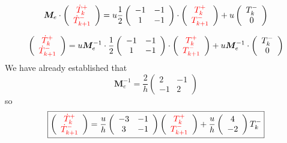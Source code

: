\begin{eqnarray}
{\bm M}_e \cdot
\left(
\begin{array}{cc}
{\color{red}\dot T_k^+}  \\
{\color{red} \dot T_{k+1}^-} 
\end{array}
\right) 
=
u\frac{1}{2}  
\left(\begin{array}{cc}
-1 & -1 \\
1 & -1 
\end{array}\right)
 \cdot 
\left( \begin{array}{cc}
{\color{red}T_k^+}  \\
{\color{red}T_{k+1}^-} 
\end{array} \right) 
+u \left( \begin{array}{cc}
{T_{k}^-}   \\  0 
\end{array} \right)
\end{eqnarray}

\begin{eqnarray}
\left(
\begin{array}{cc}
{\color{red}\dot T_k^+}  \\
{\color{red} \dot T_{k+1}^-} 
\end{array}
\right) 
=
u
{\bm M}_e^{-1} \cdot\frac{1}{2}  
\left(\begin{array}{cc}
-1 & -1 \\
1 & -1 
\end{array}\right)
 \cdot 
\left( \begin{array}{cc}
{\color{red}T_k^+}  \\
{\color{red}T_{k+1}^-} 
\end{array} \right) 
+u 
{\bm M}_e^{-1} \cdot
\left( \begin{array}{cc}
{T_{k}^-}   \\  0 
\end{array} \right)
\end{eqnarray}
We have already established that 
\[
{\bm M}_e^{-1} = 
\frac{2}{h}
\left( 
\begin{array}{cc}
2 & -1 \\
-1 & 2
\end{array}
\right)
\]
so 
\begin{eqnarray}
\boxed{
\left(
\begin{array}{cc}
{\color{red}\dot T_k^+}  \\
{\color{red} \dot T_{k+1}^-} 
\end{array}
\right)=
\frac{u}{h} 
\left(\begin{array}{cc}
    -3 & -1 \\
     3 & -1
\end{array}
\right)
\left(
\begin{array}{cc}
{\color{red}T_k^+}  \\
{\color{red}T_{k+1}^-} 
\end{array}
\right) + \frac{u}{h} \left(
\begin{array}{cc}
4   \\
-2 
\end{array}
\right)T_k^-  
}
\end{eqnarray}

